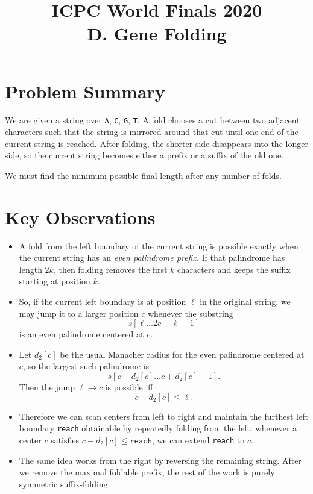 \documentclass[11pt]{article}
\title{ICPC World Finals 2020\\D. Gene Folding}
\author{}
\date{}
\begin{document}
\maketitle

\section*{Problem Summary}

We are given a string over \texttt{A}, \texttt{C}, \texttt{G}, \texttt{T}.
A fold chooses a cut between two adjacent characters such that the string is mirrored around that cut
until one end of the current string is reached.
After folding, the shorter side disappears into the longer side, so the current string becomes either a
prefix or a suffix of the old one.

We must find the minimum possible final length after any number of folds.

\section*{Key Observations}

\begin{itemize}[leftmargin=*]
    \item A fold from the left boundary of the current string is possible exactly when the current string has an
    \emph{even palindrome prefix}. If that palindrome has length $2k$, then folding removes the first $k$
    characters and keeps the suffix starting at position $k$.
    \item So, if the current left boundary is at position $\ell$ in the original string, we may jump it to a
    larger position $c$ whenever the substring
    \[
        s[\ell \dots 2c-\ell-1]
    \]
    is an even palindrome centered at $c$.
    \item Let $d_2[c]$ be the usual Manacher radius for the even palindrome centered at $c$, so the largest such
    palindrome is
    \[
        s[c-d_2[c] \dots c+d_2[c]-1].
    \]
    Then the jump $\ell \to c$ is possible iff
    \[
        c - d_2[c] \le \ell.
    \]
    \item Therefore we can scan centers from left to right and maintain the furthest left boundary
    \texttt{reach} obtainable by repeatedly folding from the left:
    whenever a center $c$ satisfies $c-d_2[c] \le \texttt{reach}$, we can extend
    \texttt{reach} to $c$.
    \item The same idea works from the right by reversing the remaining string.
    After we remove the maximal foldable prefix, the rest of the work is purely symmetric suffix-folding.
\end{itemize}
\end{document}
